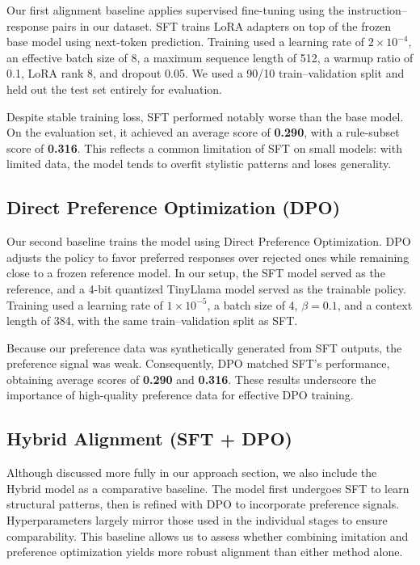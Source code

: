 \documentclass[11pt,a4paper]{article}
\begin{document}
Our first alignment baseline applies supervised fine-tuning using the instruction--response pairs in our dataset. SFT trains LoRA adapters on top of the frozen base model using next-token prediction. Training used a learning rate of $2 \times 10^{-4}$, an effective batch size of 8, a maximum sequence length of 512, a warmup ratio of 0.1, LoRA rank 8, and dropout 0.05. We used a 90/10 train--validation split and held out the test set entirely for evaluation.

Despite stable training loss, SFT performed notably worse than the base model. On the evaluation set, it achieved an average score of \textbf{0.290}, with a rule-subset score of \textbf{0.316}. This reflects a common limitation of SFT on small models: with limited data, the model tends to overfit stylistic patterns and loses generality.

\subsection{Direct Preference Optimization (DPO)}

Our second baseline trains the model using Direct Preference Optimization. DPO adjusts the policy to favor preferred responses over rejected ones while remaining close to a frozen reference model. In our setup, the SFT model served as the reference, and a 4-bit quantized TinyLlama model served as the trainable policy. Training used a learning rate of $1 \times 10^{-5}$, a batch size of 4, $\beta = 0.1$, and a context length of 384, with the same train--validation split as SFT.

Because our preference data was synthetically generated from SFT outputs, the preference signal was weak. Consequently, DPO matched SFT's performance, obtaining average scores of \textbf{0.290} and \textbf{0.316}. These results underscore the importance of high-quality preference data for effective DPO training.

\subsection{Hybrid Alignment (SFT + DPO)}

Although discussed more fully in our approach section, we also include the Hybrid model as a comparative baseline. The model first undergoes SFT to learn structural patterns, then is refined with DPO to incorporate preference signals. Hyperparameters largely mirror those used in the individual stages to ensure comparability. This baseline allows us to assess whether combining imitation and preference optimization yields more robust alignment than either method alone.
\end{document}
